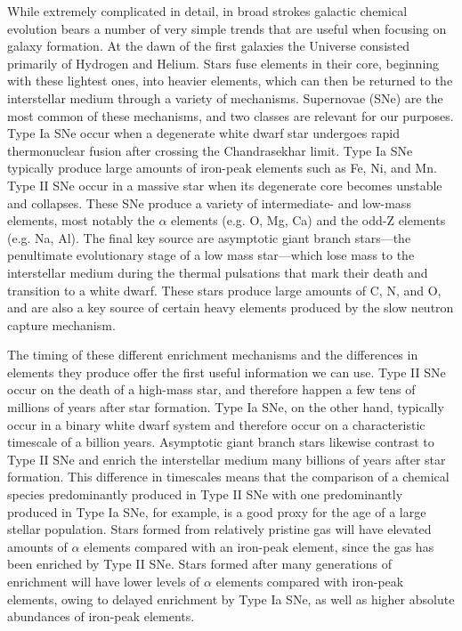 While extremely complicated in detail, in broad strokes galactic chemical evolution bears a number of very simple trends that are useful when focusing on galaxy formation. At the dawn of the first galaxies the Universe consisted primarily of Hydrogen and Helium. Stars fuse elements in their core, beginning with these lightest ones, into heavier elements, which can then be returned to the interstellar medium through a variety of mechanisms. Supernovae (SNe) are the most common of these mechanisms, and two classes are relevant for our purposes. Type Ia SNe occur when a degenerate white dwarf star undergoes rapid thermonuclear fusion after crossing the Chandrasekhar limit. Type Ia SNe typically produce large amounts of iron-peak elements such as Fe, Ni, and Mn. Type II SNe occur in a massive star when its degenerate core becomes unstable and collapses. These SNe produce a variety of intermediate- and low-mass elements, most notably the $\alpha$ elements (e.g. O, Mg, Ca) and the odd-Z elements (e.g. Na, Al). The final key source are asymptotic giant branch stars---the penultimate evolutionary stage of a low mass star---which lose mass to the interstellar medium during the thermal pulsations that mark their death and transition to a white dwarf. These stars produce large amounts of C, N, and O, and are also a key source of certain heavy elements produced by the slow neutron capture mechanism.

The timing of these different enrichment mechanisms and the differences in elements they produce offer the first useful information we can use. Type II SNe occur on the death of a high-mass star, and therefore happen a few tens of millions of years after star formation. Type Ia SNe, on the other hand, typically occur in a binary white dwarf system and therefore occur on a characteristic timescale of a billion years. Asymptotic giant branch stars likewise contrast to Type II SNe and enrich the interstellar medium many billions of years after star formation. This difference in timescales means that the comparison of a chemical species predominantly produced in Type II SNe with one predominantly produced in Type Ia SNe, for example, is a good proxy for the age of a large stellar population. Stars formed from relatively pristine gas will have elevated amounts of $\alpha$ elements compared with an iron-peak element, since the gas has been enriched by Type II SNe. Stars formed after many generations of enrichment will have lower levels of $\alpha$ elements compared with iron-peak elements, owing to delayed enrichment by Type Ia SNe, as well as higher absolute abundances of iron-peak elements.

